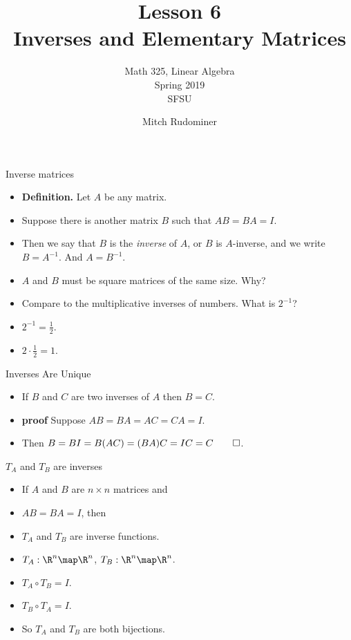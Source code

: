 \documentclass{beamer}
\title{Lesson 6 \\ Inverses and Elementary Matrices}
\subtitle{Math 325, Linear Algebra \\ Spring 2019 \\ SFSU}
\author{Mitch Rudominer}
\date{}
\begin{document}
\begin{frame}
  \titlepage
\end{frame}

\begin{frame}{Inverse matrices}

\begin{itemize}
\item \textbf{Definition.} Let $A$ be any matrix.
\item Suppose there is another matrix $B$ such that $AB = BA = I$.
\item Then we say that $B$ is the \emph{inverse} of $A$, or $B$ is $A$-inverse,
and we write $B=A^{-1}$. And $A=B^{-1}$.
\item $A$ and $B$ must be square matrices of the same size. Why?
\item Compare to the multiplicative inverses of numbers. What is $2^{-1}$?
\item $2^{-1} = \frac{1}{2}$.
\item $2 \cdot \frac{1}{2} = 1$.
\end{itemize}
\end{frame}

\begin{frame}{Inverses Are Unique}

\begin{itemize}
\item If $B$ and $C$ are two inverses of $A$ then $B=C$.
\item \textbf{proof} Suppose $AB = BA = AC =CA = I$.
\item Then $B = BI = B(AC) = (BA)C = I C = C \qed$.
\end{itemize}
\end{frame}

\begin{frame}{$T_A$ and $T_B$ are inverses}

\begin{itemize}
\item If $A$ and $B$ are $n\times n$ matrices and
\item $AB = BA = I$, then
\item $T_A$ and $T_B$ are inverse functions.
\item $T_A:\R^n\map\R^n$, $T_B:\R^n\map\R^n$.
\item $T_A\circ T_B = I$.
\item $T_B\circ T_A= I$.
\item So $T_A$ and $T_B$ are both bijections.
\end{itemize}
\end{frame}
\end{document}
